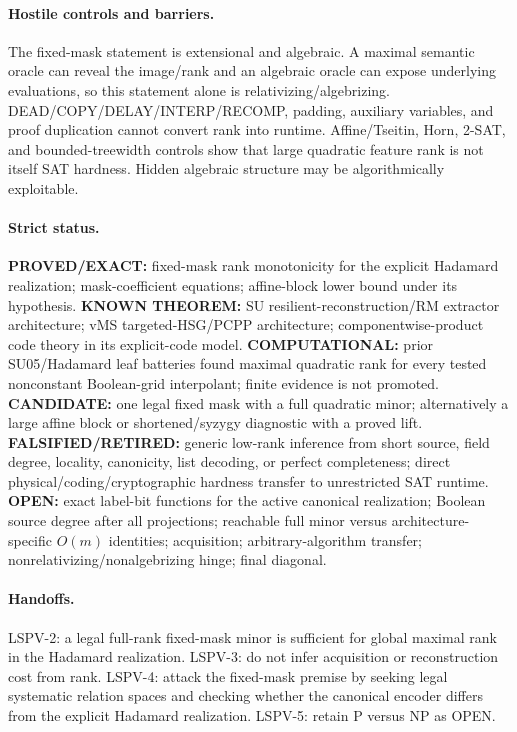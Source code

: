 \documentclass[11pt]{article}
\begin{document}
\paragraph{Hostile controls and barriers.}
The fixed-mask statement is extensional and algebraic. A maximal semantic oracle can reveal the image/rank and an algebraic oracle can expose underlying evaluations, so this statement alone is relativizing/algebrizing. DEAD/COPY/DELAY/INTERP/RECOMP, padding, auxiliary variables, and proof duplication cannot convert rank into runtime. Affine/Tseitin, Horn, 2-SAT, and bounded-treewidth controls show that large quadratic feature rank is not itself SAT hardness. Hidden algebraic structure may be algorithmically exploitable.

\paragraph{Strict status.}
\textbf{PROVED/EXACT:} fixed-mask rank monotonicity for the explicit Hadamard realization; mask-coefficient equations; affine-block lower bound under its hypothesis.
\textbf{KNOWN THEOREM:} SU resilient-reconstruction/RM extractor architecture; vMS targeted-HSG/PCPP architecture; componentwise-product code theory in its explicit-code model.
\textbf{COMPUTATIONAL:} prior SU05/Hadamard leaf batteries found maximal quadratic rank for every tested nonconstant Boolean-grid interpolant; finite evidence is not promoted.
\textbf{CANDIDATE:} one legal fixed mask with a full quadratic minor; alternatively a large affine block or shortened/syzygy diagnostic with a proved lift.
\textbf{FALSIFIED/RETIRED:} generic low-rank inference from short source, field degree, locality, canonicity, list decoding, or perfect completeness; direct physical/coding/cryptographic hardness transfer to unrestricted SAT runtime.
\textbf{OPEN:} exact label-bit functions for the active canonical realization; Boolean source degree after all projections; reachable full minor versus architecture-specific $O(m)$ identities; acquisition; arbitrary-algorithm transfer; nonrelativizing/nonalgebrizing hinge; final diagonal.

\paragraph{Handoffs.}
LSPV-2: a legal full-rank fixed-mask minor is sufficient for global maximal rank in the Hadamard realization. LSPV-3: do not infer acquisition or reconstruction cost from rank. LSPV-4: attack the fixed-mask premise by seeking legal systematic relation spaces and checking whether the canonical encoder differs from the explicit Hadamard realization. LSPV-5: retain P versus NP as OPEN.
\end{document}
